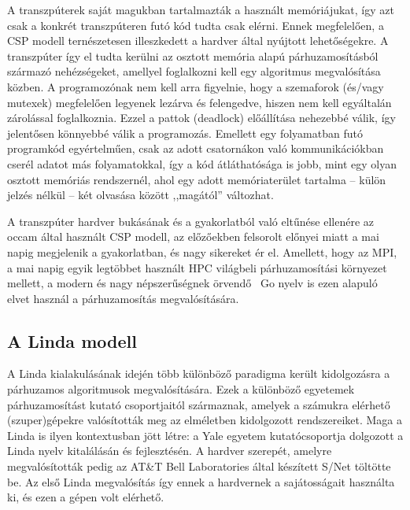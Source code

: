 A transzpúterek saját magukban tartalmazták a használt memóriájukat, így azt csak a konkrét transzpúteren futó kód tudta csak elérni.
Ennek megfelelően, a CSP modell ternészetesen illeszkedett a hardver által nyújtott lehetőségekre.
A transzpúter így el tudta kerülni az osztott memória alapú párhuzamosításból származó nehézségeket, amellyel foglalkozni kell egy algoritmus megvalósítása közben.
A programozónak nem kell arra figyelnie, hogy a szemaforok (és/vagy mutexek) megfelelően legyenek lezárva és felengedve, hiszen nem kell egyáltalán zárolással foglalkoznia.
Ezzel a pattok (deadlock) előállítása nehezebbé válik, így jelentősen könnyebbé válik a programozás.
Emellett egy folyamatban futó programkód egyértelműen, csak az adott csatornákon való kommunikációkban cserél adatot más folyamatokkal, így a kód átláthatósága is jobb, mint egy olyan osztott memóriás rendszernél, ahol egy adott memóriaterület tartalma -- külön jelzés nélkül -- két olvasása között ,,magától'' változhat.

A transzpúter hardver bukásának és a gyakorlatból való eltűnése ellenére az occam által használt CSP modell, az előzőekben felsorolt előnyei miatt a mai napig megjelenik a gyakorlatban, és nagy sikereket ér el.
Amellett, hogy az MPI, a mai napig egyik legtöbbet használt HPC világbeli párhuzamosítási környezet mellett, a modern és nagy népszerűségnek örvendő~\cite{stack_exchange_inc_technology_2024} Go nyelv is ezen alapuló elvet használ a párhuzamosítás megvalósítására.~\cite{google_frequently_nodate}

\subsection{A Linda modell}\label{subsec:linda-model}

A Linda kialakulásának idején több különböző paradigma került kidolgozásra a párhuzamos algoritmusok megvalósítására.
Ezek a különböző egyetemek párhuzamosítást kutató csoportjaitól származnak, amelyek a számukra elérhető (szuper)gépekre valósították meg az elméletben kidolgozott rendszereiket.
Maga a Linda is ilyen kontextusban jött létre: a Yale egyetem kutatócsoportja dolgozott a Linda nyelv kitalálásán és fejlesztésén.
A hardver szerepét, amelyre megvalósították pedig az { AT\&T Bell Laboratories} által készített S/Net \cite{ahuja_snet_1983} töltötte be.
Az első Linda megvalósítás így ennek a hardvernek a sajátosságait használta ki, és ezen a gépen volt elérhető.~\cite{carriero_snets_1986}

